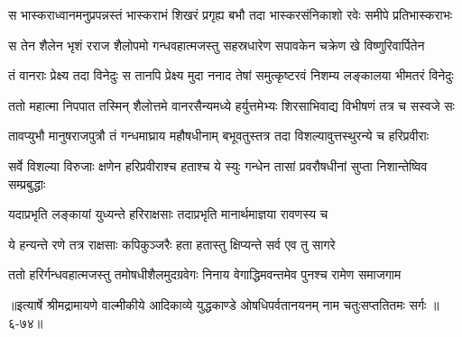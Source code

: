 \twolineshloka
{स भास्कराध्वानमनुप्रपन्नस्तं भास्कराभं शिखरं प्रगृह्य}
{बभौ तदा भास्करसंनिकाशो रवेः समीपे प्रतिभास्कराभः} %

\twolineshloka
{स तेन शैलेन भृशं रराज शैलोपमो गन्धवहात्मजस्तु}
{सहस्रधारेण सपावकेन चक्रेण खे विष्णुरिवार्पितेन} %

\twolineshloka
{तं वानराः प्रेक्ष्य तदा विनेदुः स तानपि प्रेक्ष्य मुदा ननाद}
{तेषां समुत्कृष्टरवं निशम्य लङ्कालया भीमतरं विनेदुः} %

\twolineshloka
{ततो महात्मा निपपात तस्मिन् शैलोत्तमे वानरसैन्यमध्ये}
{हर्युत्तमेभ्यः शिरसाभिवाद्य विभीषणं तत्र च सस्वजे सः} %

\twolineshloka
{तावप्युभौ मानुषराजपुत्रौ तं गन्धमाघ्राय महौषधीनाम्}
{बभूवतुस्तत्र तदा विशल्यावुत्तस्थुरन्ये च हरिप्रवीराः} %

\twolineshloka
{सर्वे विशल्या विरुजाः क्षणेन हरिप्रवीराश्च हताश्च ये स्युः}
{गन्धेन तासां प्रवरौषधीनां सुप्ता निशान्तेष्विव सम्प्रबुद्धाः} %

\twolineshloka
{यदाप्रभृति लङ्कायां युध्यन्ते हरिराक्षसाः}
{तदाप्रभृति मानार्थमाज्ञया रावणस्य च} %

\twolineshloka
{ये हन्यन्ते रणे तत्र राक्षसाः कपिकुञ्जरैः}
{हता हतास्तु क्षिप्यन्ते सर्व एव तु सागरे} %

\twolineshloka
{ततो हरिर्गन्धवहात्मजस्तु तमोषधीशैलमुदग्रवेगः}
{निनाय वेगाद्धिमवन्तमेव पुनश्च रामेण समाजगाम} %


॥इत्यार्षे श्रीमद्रामायणे वाल्मीकीये आदिकाव्ये युद्धकाण्डे ओषधिपर्वतानयनम् नाम चतुःसप्ततितमः सर्गः ॥६-७४॥
